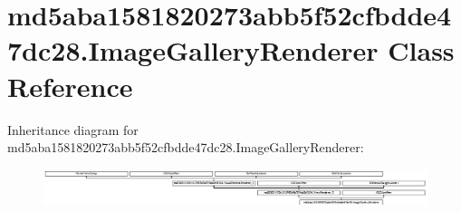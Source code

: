 \hypertarget{classmd5aba1581820273abb5f52cfbdde47dc28_1_1ImageGalleryRenderer}{}\section{md5aba1581820273abb5f52cfbdde47dc28.\+Image\+Gallery\+Renderer Class Reference}
\label{classmd5aba1581820273abb5f52cfbdde47dc28_1_1ImageGalleryRenderer}
Inheritance diagram for md5aba1581820273abb5f52cfbdde47dc28.\+Image\+Gallery\+Renderer\+:\begin{figure}[H]
\begin{center}
\leavevmode
\includegraphics[height=1.098039cm]{classmd5aba1581820273abb5f52cfbdde47dc28_1_1ImageGalleryRenderer}
\end{center}
\end{figure}
